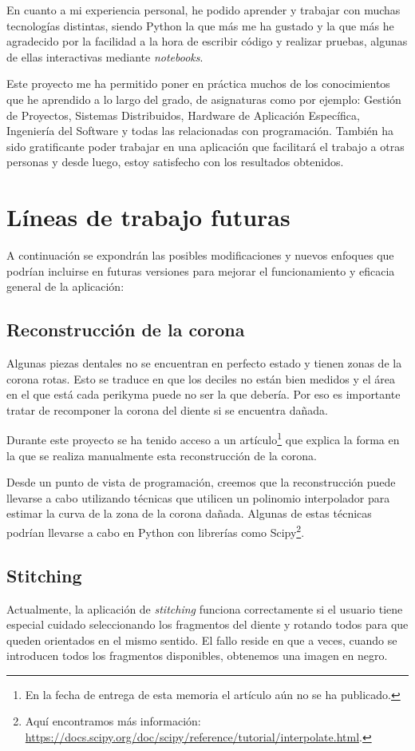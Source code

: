 En cuanto a mi experiencia personal, he podido aprender y trabajar con muchas tecnologías distintas, siendo Python la que más me ha gustado y la que más he agradecido por la facilidad a la hora de escribir código y realizar pruebas, algunas de ellas interactivas mediante \textit{notebooks}. 

Este proyecto me ha permitido poner en práctica muchos de los conocimientos que he aprendido a lo largo del grado, de asignaturas como por ejemplo: Gestión de Proyectos, Sistemas Distribuidos, Hardware de Aplicación Específica, Ingeniería del Software y todas las relacionadas con programación. También ha sido gratificante poder trabajar en una aplicación que facilitará el trabajo a otras personas y desde luego, estoy satisfecho con los resultados obtenidos.

\section{Líneas de trabajo futuras}

A continuación se expondrán las posibles modificaciones y nuevos enfoques que podrían incluirse en futuras versiones para mejorar el funcionamiento y eficacia general de la aplicación:

\subsection{Reconstrucción de la corona}
Algunas piezas dentales no se encuentran en perfecto estado y tienen zonas de la corona rotas. Esto se traduce en que los deciles no están bien medidos y el área en el que está cada perikyma puede no ser la que debería. Por eso es importante tratar de recomponer la corona del diente si se encuentra dañada.

Durante este proyecto se ha tenido acceso a un artículo\footnote{En la fecha de entrega de esta memoria el artículo aún no se ha publicado.} que explica la forma en la que se realiza manualmente esta reconstrucción de la corona.

Desde un punto de vista de programación, creemos que la reconstrucción puede llevarse a cabo utilizando técnicas que utilicen un polinomio interpolador para estimar la curva de la zona de la corona dañada. Algunas de estas técnicas podrían llevarse a cabo en Python con librerías como Scipy\footnote{Aquí encontramos más información: \url{https://docs.scipy.org/doc/scipy/reference/tutorial/interpolate.html}.}.

\subsection{Stitching}
Actualmente, la aplicación de \textit{stitching} funciona correctamente si el usuario tiene especial cuidado seleccionando los fragmentos del diente y rotando todos para que queden orientados en el mismo sentido. El fallo reside en que a veces, cuando se introducen todos los fragmentos disponibles, obtenemos una imagen en negro.

